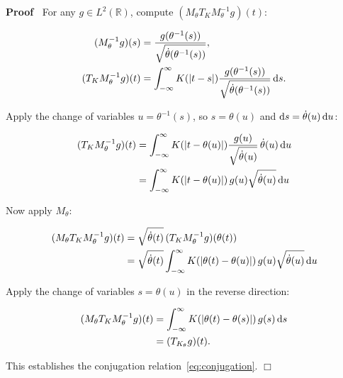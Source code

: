 \documentclass{article}
\newenvironment{proof}{\noindent\textbf{Proof\ }}{\hspace*{\fill}$\Box$\medskip}
\begin{document}
\begin{proof}
  For any $g \in L^2 (\mathbb{R})$, compute $(M_{\theta} T_K M_{\theta}^{- 1}
  g) (t)$:
  
  \begin{align}
    (M_{\theta}^{- 1} g) (s) & = \frac{g (\theta^{- 1}
    (s))}{\sqrt{\dot{\theta} (\theta^{- 1} (s))}}, \\
    (T_K M_{\theta}^{- 1} g) (t) & = \int_{- \infty}^{\infty} K (|t - s|)
    \frac{g (\theta^{- 1} (s))}{\sqrt{\dot{\theta} (\theta^{- 1} (s))}}
    \hspace{0.17em} \mathrm{d} s. 
  \end{align}
  
  Apply the change of variables $u = \theta^{- 1} (s)$, so $s = \theta (u)$
  and $\mathrm{d} s = \dot{\theta} (u) \hspace{0.17em} \mathrm{d} u$:
  
  \begin{align}
    (T_K M_{\theta}^{- 1} g) (t) & = \int_{- \infty}^{\infty} K (|t - \theta
    (u) |) \frac{g (u)}{\sqrt{\dot{\theta} (u)}}  \hspace{0.17em} \dot{\theta}
    (u) \hspace{0.17em} \mathrm{d} u \\
    & = \int_{- \infty}^{\infty} K (|t - \theta (u) |)  \hspace{0.17em} g (u)
    \sqrt{\dot{\theta} (u)} \hspace{0.17em} \mathrm{d} u 
  \end{align}
  
  Now apply $M_{\theta}$:
  
  \begin{align}
    (M_{\theta} T_K M_{\theta}^{- 1} g) (t) & = \sqrt{\dot{\theta} (t)} 
    \hspace{0.17em} (T_K M_{\theta}^{- 1} g) (\theta (t)) \\
    & = \sqrt{\dot{\theta} (t)}  \int_{- \infty}^{\infty} K (| \theta (t) -
    \theta (u) |)  \hspace{0.17em} g (u) \sqrt{\dot{\theta} (u)}
    \hspace{0.17em} \mathrm{d} u 
  \end{align}
  
  Apply the change of variables $s = \theta (u)$ in the reverse direction:
  
  \begin{align}
    (M_{\theta} T_K M_{\theta}^{- 1} g) (t) & = \int_{- \infty}^{\infty} K (|
    \theta (t) - \theta (s) |)  \hspace{0.17em} g (s) \hspace{0.17em}
    \mathrm{d} s \\
    & = (T_{K_{\theta}} g) (t) . 
  \end{align}
  
  This establishes the conjugation relation~\eqref{eq:conjugation}.
\end{proof}
\end{document}
